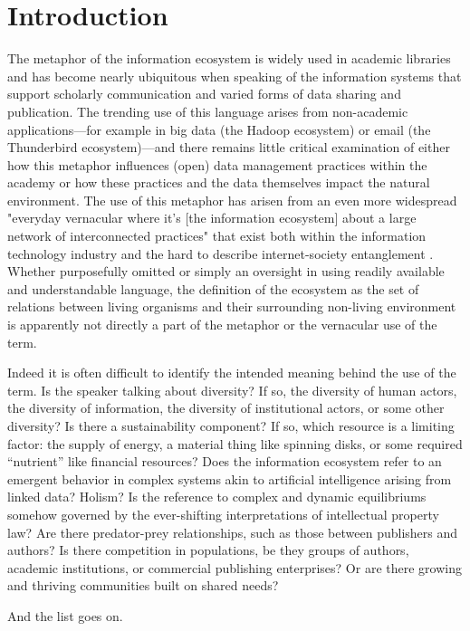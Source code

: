 \section{Introduction}

The metaphor of the information ecosystem is widely used in academic libraries and has become nearly ubiquitous when speaking of the information systems that support scholarly communication and varied forms of data sharing and publication. The trending use of this language arises from non-academic applications—for example in big data (the Hadoop ecosystem) or email (the Thunderbird ecosystem)—and there remains little critical examination of either how this metaphor influences (open) data management practices within the academy or how these practices and the data themselves impact the natural environment. The use of this metaphor has arisen from an even more widespread "everyday vernacular where it’s [the information ecosystem] about a large network of interconnected practices" that exist both within the information technology industry and the hard to describe internet-society entanglement \cite{boyd_2016}. Whether purposefully omitted or simply an oversight in using readily available and understandable language, the definition of the ecosystem as the set of relations between living organisms and their surrounding non-living environment is apparently not directly a part of the metaphor or the vernacular use of the term.

Indeed it is often difficult to identify the intended meaning behind the use of the term. Is the speaker talking about diversity? If so, the diversity of human actors, the diversity of information, the diversity of institutional actors, or some other diversity? Is there a sustainability component? If so, which resource is a limiting factor: the supply of energy, a material thing like spinning disks, or some required “nutrient” like financial resources? Does the information ecosystem refer to an emergent behavior in complex systems akin to artificial intelligence arising from linked data? Holism? Is the reference to complex and dynamic equilibriums somehow governed by the ever-shifting interpretations of intellectual property law? Are there predator-prey relationships, such as those between publishers and authors? Is there competition in populations, be they groups of authors, academic institutions, or commercial publishing enterprises? Or are there growing and thriving communities built on shared needs? 

And the list goes on. 

